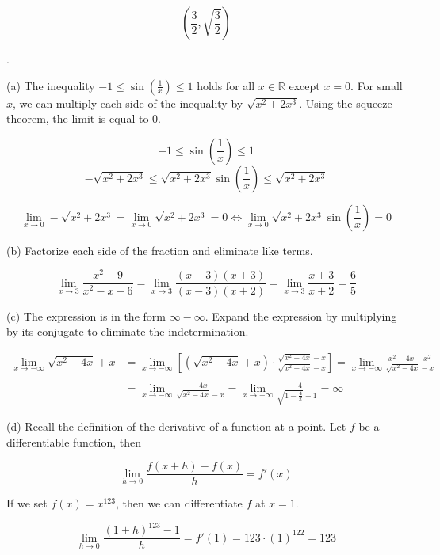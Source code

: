 \documentclass{article}
\begin{document}
\[\boxed{\left(\frac32,\sqrt{\frac32}\right)}\]

\newpage

.

\hfill

\noindent (a) The inequality $\displaystyle-1 \leq \sin\left(\frac1x\right)\leq1$ holds for all $x\in\mathbb{R}$ except $x=0$. For small $x$, we can multiply each side of the inequality by $\sqrt{x^2+2x^3}$. Using the squeeze theorem, the limit is equal to $0$.

\[-1\leq\sin\left(\frac1x\right)\leq1\]
\[-\sqrt{x^2+2x^3}\leq\sqrt{x^2+2x^3}\sin\left(\frac1x\right)\leq\sqrt{x^2+2x^3}\]

\[\lim_{x\to0}-\sqrt{x^2+2x^3}=\lim_{x\to0}\sqrt{x^2+2x^3}=0\iff\lim_{x\to0}\sqrt{x^2+2x^3}\sin\left(\frac1x\right)=\boxed0\]

\hfill

\noindent (b) Factorize each side of the fraction and eliminate like terms.

\[\lim_{x\to3}\frac{x^2-9}{x^2-x-6}=\lim_{x\to3}\frac{(x-3)(x+3)}{(x-3)(x+2)}=\lim_{x\to3}\frac{x+3}{x+2}=\boxed{\frac65}\]

\hfill

\noindent (c) The expression is in the form $\infty-\infty$. Expand the expression by multiplying by its conjugate to eliminate the indetermination.

\begin{align*}
\lim_{x\to-\infty}\sqrt{x^2-4x}+x&=\lim_{x\to-\infty}\left[\left(\sqrt{x^2-4x} + x\right) \cdot\frac{\sqrt{x^2-4x}-x}{\sqrt{x^2-4x}-x}\right]=\lim_{x\to-\infty}\frac{x^2-4x-x^2}{\sqrt{x^2-4x}-x}\\\\&=\lim_{x\to-\infty}\frac{-4x}{\sqrt{x^2-4x}-x}=\lim_{x\to-\infty}\frac{-4}{\displaystyle \sqrt{1-\frac4x} -1}=\boxed{\infty}\end{align*}

\hfill

\noindent (d) Recall the definition of the derivative of a function at a point. Let $f$ be a differentiable function, then

\[\lim_{h\to 0} \frac{f(x+h)-f(x)}{h} = f'(x)\]

\hfill

\noindent If we set $f(x) = x^{123}$, then we can differentiate $f$ at $x=1$.

\[\lim_{h\to0}\frac{(1+h)^{123}-1}{h}=f'(1)=123\cdot(1)^{122} = \boxed{123}\]

\newpage
\end{document}
